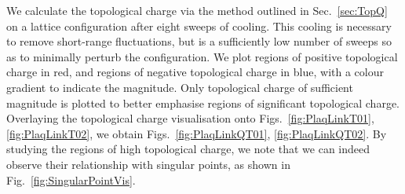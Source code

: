 We calculate the topological charge via the method outlined in Sec.~\ref{sec:TopQ} on a lattice configuration after eight sweeps of cooling. This cooling is necessary to remove short-range fluctuations, but is a sufficiently low number of sweeps so as to minimally perturb the configuration. We plot regions of positive topological charge in red, and regions of negative topological charge in blue, with a colour gradient to indicate the magnitude. Only topological charge of sufficient magnitude is plotted to better emphasise regions of significant topological charge. Overlaying the topological charge visualisation onto Figs.~\ref{fig:PlaqLinkT01}, \ref{fig:PlaqLinkT02}, we obtain Figs.~\ref{fig:PlaqLinkQT01}, \ref{fig:PlaqLinkQT02}. By studying the regions of high topological charge, we note that we can indeed observe their relationship with singular points, as shown in Fig.~\ref{fig:SingularPointVis}.\\
%
